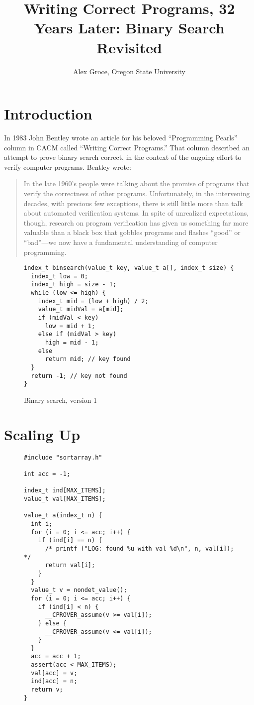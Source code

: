 \documentclass{article}
\title{Writing Correct Programs, 32 Years Later: Binary Search Revisited}
\author{Alex Groce, Oregon State University}
\begin{document}
\maketitle

\section{Introduction}

In 1983 John Bentley wrote an article \cite{Bentley} for his beloved
``Programming Pearls'' column in CACM called ``Writing Correct
Programs.''  That column described an attempt to prove binary search
correct, in the context of the ongoing effort to verify computer
programs.  Bentley wrote:

\begin{quote}
In the late 1960's people were talking about the promise of programs that verify the correctness of other programs.  Unfortunately, in the intervening decades, with precious few exceptions, there is still little more than talk about automated verification systems.  In spite of unrealized expectations, though, research on program verification has given us something far more valuable than a black box that gobbles programs and flashes ``good'' or ``bad''---we now have a fundamental understanding of computer programming.
\end{quote}

\begin{figure}
\begin{verbatim}
index_t binsearch(value_t key, value_t a[], index_t size) {
  index_t low = 0;
  index_t high = size - 1;
  while (low <= high) {
    index_t mid = (low + high) / 2;
    value_t midVal = a[mid];
    if (midVal < key)
      low = mid + 1;
    else if (midVal > key)
      high = mid - 1;
    else
      return mid; // key found
  }
  return -1; // key not found
}
\end{verbatim}
\caption{Binary search, version 1}
\label{fig:binsearch1}
\end{figure}

\section{Scaling Up}

\begin{figure}
\begin{verbatim}
#include "sortarray.h"

int acc = -1;

index_t ind[MAX_ITEMS];
value_t val[MAX_ITEMS];

value_t a(index_t n) {
  int i;
  for (i = 0; i <= acc; i++) {
    if (ind[i] == n) {
      /* printf ("LOG: found %u with val %d\n", n, val[i]); */
      return val[i];
    }
  }
  value_t v = nondet_value();
  for (i = 0; i <= acc; i++) {
    if (ind[i] < n) {
      __CPROVER_assume(v >= val[i]);
    } else {
      __CPROVER_assume(v <= val[i]);
    }
  }
  acc = acc + 1;
  assert(acc < MAX_ITEMS);
  val[acc] = v;
  ind[acc] = n;
  return v;
}
\end{verbatim}
\end{figure}
\end{document}

